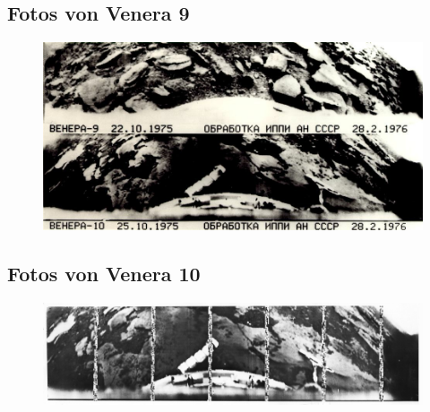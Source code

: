 \documentclass{beamer}
\begin{document}
	\subsection{Fotos von Venera 9}
	\begin{frame}
		\begin{figure}
			\includegraphics[scale=0.32]{./images/venera_9}
		\end{figure}
	\end{frame}
	\subsection{Fotos von Venera 10}
	\begin{frame}
		\begin{figure}
			\includegraphics[scale=0.9]{./images/venera_10}
		\end{figure}
	\end{frame}
\end{document}
